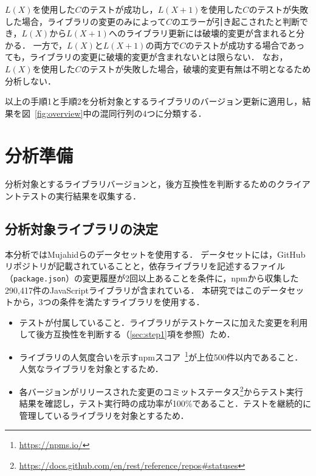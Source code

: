 \documentclass[submit]{ipsj}
\begin{document}
\begin{table}[h]
  \centering
  \caption{$C$が$L(X)$または$L(X+1)$を使用した時のテスト結果に基づく破壊的変更の有無}
  \label{fig:valid}
\end{table}

$L(X)$を使用した$C$のテストが成功し，$L(X+1)$を使用した$C$のテストが失敗した場合，ライブラリの変更のみによって$C$のエラーが引き起こされたと判断でき，$L(X)$から$L(X+1)$へのライブラリ更新には破壊的変更が含まれると分かる．
一方で，$L(X)$と$L(X+1)$の両方で$C$のテストが成功する場合であっても，ライブラリの変更に破壊的変更が含まれないとは限らない．
なお，$L(X)$を使用した$C$のテストが失敗した場合，破壊的変更有無は不明となるため分析しない．

以上の手順1と手順2を分析対象とするライブラリのバージョン更新に適用し，結果を図~\ref{fig:overview}中の混同行列の4つに分類する．

\section{分析準備}
\label{sec:prepare}

分析対象とするライブラリバージョンと，後方互換性を判断するためのクライアントテストの実行結果を収集する．

\subsection{分析対象ライブラリの決定}
本分析ではMujahidらのデータセット\cite{Dataset}を使用する．
データセットには，GitHubリポジトリが記載されていることと，依存ライブラリを記述するファイル（{\verb|package.json|}）の変更履歴が2回以上あることを条件に，npmから収集した290,417件のJavaScriptライブラリが含まれている．
本研究ではこのデータセットから，3つの条件を満たすライブラリを使用する．

\begin{itemize}
\item テストが付属していること．ライブラリがテストケースに加えた変更を利用して後方互換性を判断する（\ref{sec:step1}項を参照）ため．
\item ライブラリの人気度合いを示すnpmスコア~\footnote{\url{https://npms.io/}}が上位500件以内であること．人気なライブラリを対象とするため．
\item 各バージョンがリリースされた変更のコミットステータス\footnote{\url{https://docs.github.com/en/rest/reference/repos#statuses}}からテスト実行結果を確認し，テスト実行時の成功率が100\%であること．テストを継続的に管理しているライブラリを対象とするため．
\end{itemize}
\end{document}
